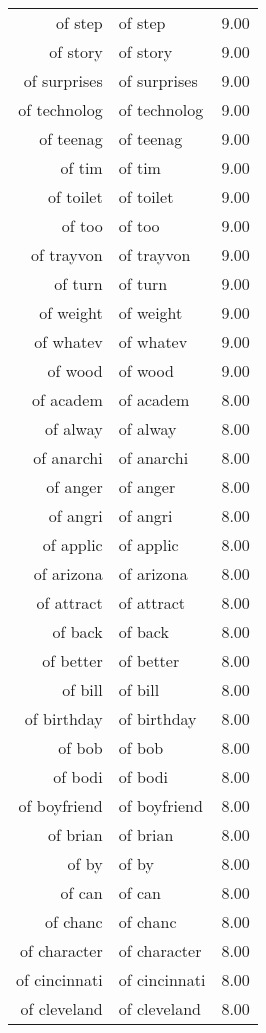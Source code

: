 \begin{table}[ht]
\begin{tabular}{rlr}
  of step & of step & 9.00 \\ 
  of story & of story & 9.00 \\ 
  of surprises & of surprises & 9.00 \\ 
  of technolog & of technolog & 9.00 \\ 
  of teenag & of teenag & 9.00 \\ 
  of tim & of tim & 9.00 \\ 
  of toilet & of toilet & 9.00 \\ 
  of too & of too & 9.00 \\ 
  of trayvon & of trayvon & 9.00 \\ 
  of turn & of turn & 9.00 \\ 
  of weight & of weight & 9.00 \\ 
  of whatev & of whatev & 9.00 \\ 
  of wood & of wood & 9.00 \\ 
  of academ & of academ & 8.00 \\ 
  of alway & of alway & 8.00 \\ 
  of anarchi & of anarchi & 8.00 \\ 
  of anger & of anger & 8.00 \\ 
  of angri & of angri & 8.00 \\ 
  of applic & of applic & 8.00 \\ 
  of arizona & of arizona & 8.00 \\ 
  of attract & of attract & 8.00 \\ 
  of back & of back & 8.00 \\ 
  of better & of better & 8.00 \\ 
  of bill & of bill & 8.00 \\ 
  of birthday & of birthday & 8.00 \\ 
  of bob & of bob & 8.00 \\ 
  of bodi & of bodi & 8.00 \\ 
  of boyfriend & of boyfriend & 8.00 \\ 
  of brian & of brian & 8.00 \\ 
  of by & of by & 8.00 \\ 
  of can & of can & 8.00 \\ 
  of chanc & of chanc & 8.00 \\ 
  of character & of character & 8.00 \\ 
  of cincinnati & of cincinnati & 8.00 \\ 
  of cleveland & of cleveland & 8.00 \\ 

\end{tabular}
\end{table}
